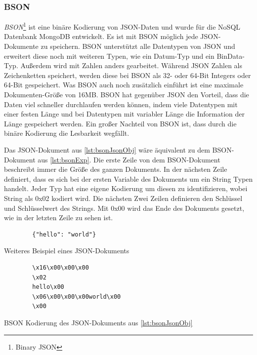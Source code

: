 \subsubsection{BSON}
\textit{BSON}\footnote{Binary JSON} ist eine binäre Kodierung von JSON-Daten und wurde für die NoSQL Datenbank MongoDB entwickelt. Es ist mit BSON möglich jede JSON-Dokumente zu speichern. BSON unterstützt alle Datentypen von JSON und erweitert diese noch mit weiteren Typen, wie ein Datum-Typ und ein BinData-Typ. Außerdem wird mit Zahlen anders gearbeitet. Während JSON Zahlen als Zeichenketten speichert, werden diese bei BSON als 32- oder 64-Bit Integers oder 64-Bit  gespeichert. Was BSON auch noch zusätzlich einführt ist eine maximale Dokumenten-Größe von 16MB. BSON hat gegenüber JSON den Vorteil, dass die Daten viel schneller durchlaufen werden können, indem viele Datentypen mit einer festen Länge und bei Datentypen mit variabler Länge die Information der Länge gespeichert werden. Ein großer Nachteil von BSON ist, dass durch die binäre Kodierung die Lesbarkeit wegfällt.\cite{bsonspecBSONBinary}\cite{postgreSQLandBSON}\cite{mongodbJSONBSON}

Das JSON-Dokument aus \ref{lst:bsonJsonObj} wäre äquivalent zu dem BSON-Dokument aus \ref{lst:bsonExp}. Die erste Zeile von dem BSON-Dokument beschreibt immer die Größe des ganzen Dokuments. In der nächsten Zeile definiert, dass es sich bei der ersten Variable des Dokuments um ein String Typen handelt. Jeder Typ hat eine eigene Kodierung um diesen zu identifizieren, wobei String als 0x02 kodiert wird. Die nächsten Zwei Zeilen definieren den Schlüssel und Schlüsselwert des Strings. Mit 0x00 wird das Ende des Dokuments gesetzt, wie in der letzten Zeile zu sehen ist.

\begin{listing}[htp]
    \begin{verbatim}
        {"hello": "world"}
    \end{verbatim}
    \caption{Weiteres Beispiel eines JSON-Dokuments \cite{mongodbJSONBSON}}
    \label{lst:bsonJsonObj}
\end{listing} 

\begin{listing}[htp]
    \begin{verbatim} 
        \x16\x00\x00\x00           
        \x02                      
        hello\x00                  
        \x06\x00\x00\x00world\x00  
        \x00                       
    \end{verbatim}
    \caption{BSON Kodierung des JSON-Dokuments aus \ref{lst:bsonJsonObj} \cite{mongodbJSONBSON}}
    \label{lst:bsonExp}
\end{listing}

